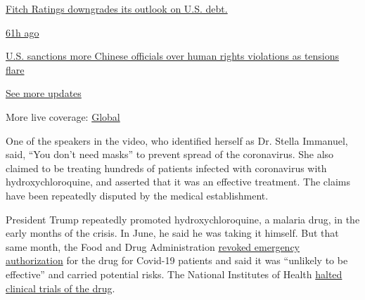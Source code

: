 \href{https://www.nytimes3xbfgragh.onion/live/2020/07/31/business/stock-market-today-coronavirus?action=click\&pgtype=Article\&state=default\&region=MAIN_CONTENT_1\&context=storylines_live_updates\#fitch-ratings-downgrades-its-outlook-on-us-debt}{Fitch
Ratings downgrades its outlook on U.S. debt.}

\href{https://www.nytimes3xbfgragh.onion/live/2020/07/31/business/stock-market-today-coronavirus?action=click\&pgtype=Article\&state=default\&region=MAIN_CONTENT_1\&context=storylines_live_updates\#us-sanctions-more-chinese-officials-over-human-rights-violations-as-tensions-flare}{61h
ago}

\href{https://www.nytimes3xbfgragh.onion/live/2020/07/31/business/stock-market-today-coronavirus?action=click\&pgtype=Article\&state=default\&region=MAIN_CONTENT_1\&context=storylines_live_updates\#us-sanctions-more-chinese-officials-over-human-rights-violations-as-tensions-flare}{U.S.
sanctions more Chinese officials over human rights violations as
tensions flare}

\href{https://www.nytimes3xbfgragh.onion/live/2020/07/31/business/stock-market-today-coronavirus?action=click\&pgtype=Article\&state=default\&region=MAIN_CONTENT_1\&context=storylines_live_updates}{See
more updates}

More live coverage:
\href{https://www.nytimes3xbfgragh.onion/2020/08/01/world/coronavirus-covid-19.html?action=click\&pgtype=Article\&state=default\&region=MAIN_CONTENT_1\&context=storylines_live_updates}{Global}

One of the speakers in the video, who identified herself as Dr. Stella
Immanuel, said, ``You don't need masks'' to prevent spread of the
coronavirus. She also claimed to be treating hundreds of patients
infected with coronavirus with hydroxychloroquine, and asserted that it
was an effective treatment. The claims have been repeatedly disputed by
the medical establishment.

President Trump repeatedly promoted hydroxychloroquine, a malaria drug,
in the early months of the crisis. In June, he said he was taking it
himself. But that same month, the Food and Drug Administration
\href{https://www.fda.gov/media/138945/download}{revoked emergency
authorization} for the drug for Covid-19 patients and said it was
``unlikely to be effective'' and carried potential risks. The National
Institutes of Health
\href{https://www.nytimes3xbfgragh.onion/2020/06/20/health/hydroxychloroquine-coronavirus-trial.html}{halted
clinical trials of the drug}.

